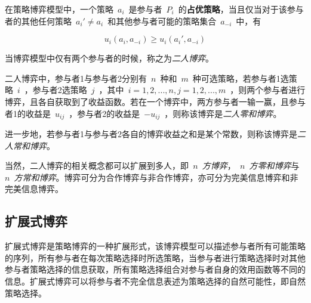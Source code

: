 \begin{definition}
	在策略博弈模型中，一个策略~$a_i$~是参与者~$P_i$~的\textbf{占优策略}，当且仅当对于该参与者的其他任何策略~$a_i'\neq a_i$~和其他参与者可能的策略集合~$a_{-i}$~中，有
	
	\begin{equation}
	u_i(a_i,a_{-i}) \geq 	u_i(a_i',a_{-i})
	\end{equation}
\end{definition}

\begin{definition}
	当博弈模型中仅有两个参与者的时候，称之为\textit{二人博弈}。
\end{definition}



\begin{definition}
二人博弈中，参与者1与参与者2分别有~$n$~种和~$m$~种可选策略，若参与者1选策略~$i$~，参与者2选策略~$j$~，其中~$i=1,2,...,n,j=1,2,...,m$~，则两个参与者进行博弈，且各自获取到了收益函数。若在一个博弈中，两方参与者一输一赢，且参与者1的收益是~$u_{ij}$~，参与者2的收益是~$-u_{ij}$~，则称该博弈是\textit{二人零和博弈}。
\end{definition}

\begin{definition}
	进一步地，若参与者1与参与者2各自的博弈收益之和是某个常数，则称该博弈是\textit{二人常和博弈}。
\end{definition}

当然，二人博弈的相关概念都可以扩展到多人，即\textit{~$n$~方博弈}，\textit{~$n$~方零和博弈}与\textit{~$n$~方常和博弈}。博弈可分为合作博弈与非合作博弈，亦可分为完美信息博弈和非完美信息博弈。



\subsection{扩展式博弈}

扩展式博弈是策略博弈的一种扩展形式，该博弈模型可以描述参与者所有可能策略的序列，所有参与者在每次策略选择时所选策略，当参与者进行策略选择时对其他参与者策略选择的信息获取，所有策略选择组合对参与者自身的效用函数等不同的信息。扩展式博弈可以将参与者不完全信息表述为策略选择的自然可能性，即自然策略选择。


